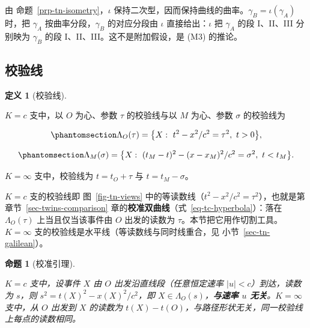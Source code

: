 \documentclass[
  chinese,
  a4paper,
  UTF8,
  12pt,
  oneside,
  openany]{ctexbook}
\theoremstyle{plain}
\theoremstyle{plain}
\theoremstyle{plain}
\newtheorem{proposition}{命题}[chapter]
\theoremstyle{definition}
\newtheorem{definition}{定义}[chapter]
\theoremstyle{plain}
\theoremstyle{plain}
\theoremstyle{remark}
\begin{document}
由 命题~\ref{prp-tn-isometry}，\(\iota\)
保持二次型，因而保持曲线的曲率。\(\gamma_B=\iota(\gamma_A)\) 时，把
\(\gamma_A\) 按曲率分段，\(\gamma_B\) 的对应分段由 \(\iota\)
直接给出：\(\iota\) 把 \(\gamma_A\) 的段 I、II、III 分别映为
\(\gamma_B\) 的段 I、II、III。这不是附加假设，是 (M3) 的推论。

\subsection{校验线}\label{ux6821ux9a8cux7ebf}

\begin{definition}[校验线]\protect\hypertarget{def-tn-calibration}{}\label{def-tn-calibration}

\(K=c\) 支中，以 \(O\) 为心、参数 \(\tau\) 的校验线与以 \(M\) 为心、参数
\(\sigma\) 的校验线为

\begin{equation}\protect\phantomsection\label{eq-tn-calibration}{
\Lambda_O(\tau)=\bigl\{X:\ t^{2}-x^{2}/c^{2}=\tau^{2},\ t>0\bigr\},
}\end{equation}

\begin{equation}\protect\phantomsection\label{eq-tn-calibration-m}{
\Lambda_M(\sigma)=\bigl\{X:\ (t_M-t)^{2}-(x-x_M)^{2}/c^{2}=\sigma^{2},\ t<t_M\bigr\}.
}\end{equation}

\(K=\infty\) 支中，校验线为 \(t=t_O+\tau\) 与 \(t=t_M-\sigma\)。

\end{definition}

\(K=c\) 支的校验线即 图~\ref{fig-tn-views}
中的等读数线（\(t^{2}-x^{2}/c^{2}=\tau^{2}\)），也就是第
章节~\ref{sec-twins-comparison}
章的\textbf{校准双曲线}（式~\ref{eq-tc-hyperbola}）：落在
\(\Lambda_O(\tau)\) 上当且仅当该事件由 \(O\) 出发的读数为
\(\tau\)。本节把它用作切割工具。\(K=\infty\)
支的校验线是水平线（等读数线与同时线重合，见
小节~\ref{sec-tn-galilean}）。

\begin{proposition}[校准引理]\protect\hypertarget{prp-tn-calibration}{}\label{prp-tn-calibration}

\(K=c\) 支中，设事件 \(X\) 由 \(O\) 出发沿直线段（任意恒定速率
\(|u|<c\)）到达，读数为 \(s\)，则 \(s^{2}=t(X)^{2}-x(X)^{2}/c^{2}\)，即
\(X\in\Lambda_O(s)\)，\textbf{与速率 \(u\) 无关}。\(K=\infty\) 支中，从
\(O\) 出发到 \(X\) 的读数为
\(t(X)-t(O)\)，与路径形状无关，同一校验线上每点的读数相同。

\end{proposition}
\end{document}
